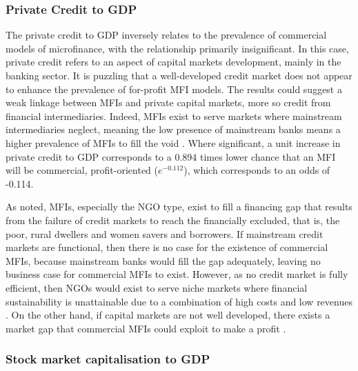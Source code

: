 \documentclass[a4paper, nobind]{templates/ociamthesis}
\begin{document}
\hypertarget{private-credit-to-gdp}{%
\subsubsection{Private Credit to GDP}\label{private-credit-to-gdp}}

The private credit to GDP inversely relates to the prevalence of commercial models of microfinance, with the relationship primarily insignificant. In this case, private credit refers to an aspect of capital markets development, mainly in the banking sector. It is puzzling that a well-developed credit market does not appear to enhance the prevalence of for-profit MFI models. The results could suggest a weak linkage between MFIs and private capital markets, more so credit from financial intermediaries. Indeed, MFIs exist to serve markets where mainstream intermediaries neglect, meaning the low presence of mainstream banks means a higher prevalence of MFIs to fill the void \autocite{de2007economics}. Where significant, a unit increase in private credit to GDP corresponds to a 0.894 times lower chance that an MFI will be commercial, profit-oriented (\(e^{-0.112}\)), which corresponds to an odds of -0.114.

As noted, MFIs, especially the NGO type, exist to fill a financing gap that results from the failure of credit markets to reach the financially excluded, that is, the poor, rural dwellers and women savers and borrowers. If mainstream credit markets are functional, then there is no case for the existence of commercial MFIs, because mainstream banks would fill the gap adequately, leaving no business case for commercial MFIs to exist. However, as no credit market is fully efficient, then NGOs would exist to serve niche markets where financial sustainability is unattainable due to a combination of high costs and low revenues \autocite{de2007economics}. On the other hand, if capital markets are not well developed, there exists a market gap that commercial MFIs could exploit to make a profit \autocite{d2013unsubsidized,armendariz2013subsidy}.

\hypertarget{stock-market-capitalisation-to-gdp}{%
\subsubsection{Stock market capitalisation to GDP}\label{stock-market-capitalisation-to-gdp}}
\end{document}
